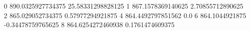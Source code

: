 0 890.0325927734375 25.58331298828125
1 867.1578369140625 2.70855712890625
2 865.029052734375 0.57977294921875
4 864.4492797851562 0.0
6 864.1044921875 -0.34478759765625
8 864.6254272460938 0.1761474609375
